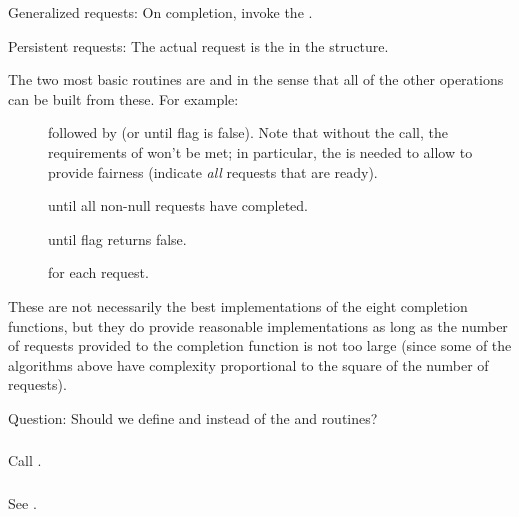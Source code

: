 \documentclass{article}
\begin{document}
Generalized requests:  On completion, invoke the
. 

Persistent requests: The actual request is the
 in the
 structure.

The two most basic routines are  and
 in the sense that all of the other operations
can be built from these.  For example:
\begin{description}
\item[]
\item[] followed by
 (or  until flag is false).
Note that without the  
call, the requirements of  won't be met; in
particular, the  is needed to allow
 to provide fairness (indicate \emph{all}
requests that are ready).
\item[] until all non-null
requests have completed.
\item[]
\item[] until flag returns
false.
\item[] for each request.
\end{description}
These are not necessarily the best implementations of the eight
completion functions, but they do provide reasonable implementations
as long as the number of requests provided to the completion function
is not too large (since some of the algorithms above have complexity
proportional to the square of the number of requests).

Question:  Should we define  and
 instead of the  and
 routines?

\subsubsection{}
Call .

\subsubsection{}
See .
\end{document}
